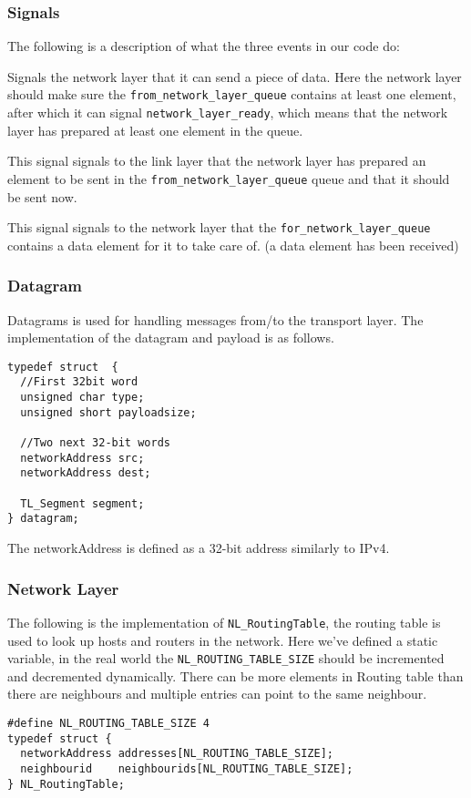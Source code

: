 \subsubsection{Signals}
The following is a description of what the three events in our code do:
\begin{description}[leftmargin=1em, style=nextline]
\item [\texttt{network\_layer\_allowed\_to\_send}] Signals the network layer that it can send a piece of data.
Here the network layer should make sure the \texttt{from\_network\_layer\_queue}
contains at least one element, after which it can signal \texttt{network\_layer\_ready},
which means that the network layer has prepared at least one element in the queue.

\item [\texttt{network\_layer\_ready}] This signal signals to the link layer that the network layer has prepared an element to be sent in the
 \texttt{from\_network\_layer\_queue} queue and that it should be sent now.

\item [\texttt{data\_for\_network\_layer}]
This signal signals to the network layer that the
\texttt{for\_network\_layer\_queue} contains a data element for it to take care of. (a data element has been received)
\end{description}

\subsubsection{Datagram}
Datagrams is used for handling messages from/to the transport layer.
The implementation of the datagram and payload is as follows.
\begin{lstlisting}
typedef struct  {
  //First 32bit word
  unsigned char type;
  unsigned short payloadsize;

  //Two next 32-bit words
  networkAddress src;
  networkAddress dest;

  TL_Segment segment;
} datagram;
\end{lstlisting}
The networkAddress is defined as a 32-bit address similarly to IPv4.

\subsubsection{Network Layer}

The following is the implementation of \texttt{NL\_RoutingTable}, the routing table is used to look up hosts and routers in the network.
Here we've defined a static variable, in the real world the \texttt{NL\_ROUTING\_TABLE\_SIZE} should be incremented and decremented dynamically.
There can be more elements in Routing table than there are neighbours and multiple entries can point to the same neighbour.
\begin{lstlisting}
#define NL_ROUTING_TABLE_SIZE 4
typedef struct {
  networkAddress addresses[NL_ROUTING_TABLE_SIZE];
  neighbourid    neighbourids[NL_ROUTING_TABLE_SIZE];
} NL_RoutingTable;
\end{lstlisting}

